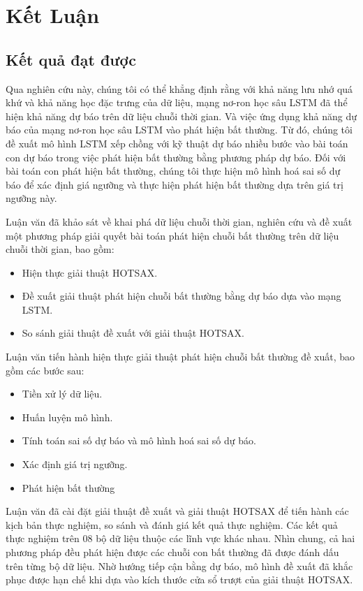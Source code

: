 \chapter{Kết Luận}
\section{Kết quả đạt được}
Qua nghiên cứu này, chúng tôi có thể khẳng định rằng với khả năng lưu nhớ quá khứ và khả năng học đặc trưng của dữ liệu, mạng nơ-ron học sâu LSTM đã thể hiện khả năng dự báo trên dữ liệu chuỗi thời gian. Và việc ứng dụng khả năng dự báo của mạng nơ-ron học sâu LSTM vào phát hiện bất thường. Từ đó, chúng tôi đề xuất mô hình LSTM xếp chồng với kỹ thuật dự báo nhiều bước vào bài toán con dự báo trong việc phát hiện bất thường bằng phương pháp dự báo. Đối với bài toán con phát hiện bất thường, chúng tôi thực hiện mô hình hoá sai số dự báo để xác định giá ngưỡng và thực hiện phát hiện bất thường dựa trên giá trị ngưỡng này.

Luận văn đã khảo sát về khai phá dữ liệu chuỗi thời gian, nghiên cứu và đề xuất một phương pháp giải quyết bài toán phát hiện chuỗi bất thường trên dữ liệu chuỗi thời gian, bao gồm:
\begin{itemize}
\item Hiện thực giải thuật HOTSAX.
\item Đề xuất giải thuật phát hiện chuỗi bất thường bằng dự báo dựa vào mạng LSTM.
\item So sánh giải thuật đề xuất với giải thuật HOTSAX.
\end{itemize}

Luận văn tiến hành hiện thực giải thuật phát hiện chuỗi bất thường đề xuất, bao gồm các bước sau:
\begin{itemize}
\item Tiền xử lý dữ liệu.
\item Huấn luyện mô hình.
\item Tính toán sai số dự báo và mô hình hoá sai số dự báo.
\item Xác định giá trị ngưỡng.
\item Phát hiện bất thường
\end{itemize}

Luận văn đã cài đặt giải thuật đề xuất và giải thuật HOTSAX để tiến hành các kịch bản thực nghiệm, so sánh và đánh giá kết quả thực nghiệm. Các kết quả thực nghiệm trên 08 bộ dữ liệu thuộc các lĩnh vực khác nhau. Nhìn chung, cả hai phương pháp đều phát hiện được các chuỗi con bất thường đã được đánh dấu trên từng bộ dữ liệu. Nhờ hướng tiếp cận bằng dự báo, mô hình đề xuất đã khắc phục được hạn chế khi dựa vào kích thước cửa sổ trượt của giải thuật HOTSAX.

